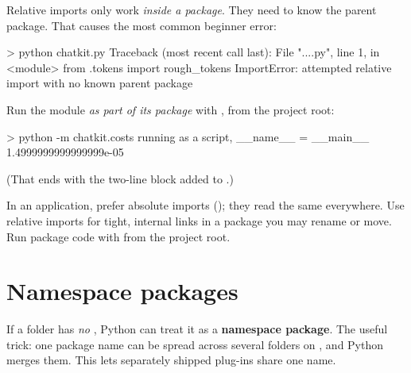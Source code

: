 Relative imports only work \emph{inside a package}. They need to know the parent package.
That causes the most common beginner error:

\begin{rawcode}
> python chatkit\costs.py
Traceback (most recent call last):
  File "...\chatkit\costs.py", line 1, in <module>
    from .tokens import rough_tokens
ImportError: attempted relative import with no known parent package
\end{rawcode}

Run the module \emph{as part of its package} with , from the project root:

\begin{rawcode}
> python -m chatkit.costs
running as a script, __name__ = __main__
1.4999999999999999e-05
\end{rawcode}

(That ends with the two-line  block added to .)

\begin{gamerule}
In an application, prefer absolute imports (); they read the
same everywhere. Use relative imports for tight, internal links in a package you may rename
or move. Run package code with  from the project root.
\end{gamerule}

\section{Namespace packages}

If a folder has \emph{no} , Python can treat it as a \textbf{namespace package}.
The useful trick: one package name can be spread across several folders on , and
Python merges them. This lets separately shipped plug-ins share one name.

\begin{center}
\end{center}

